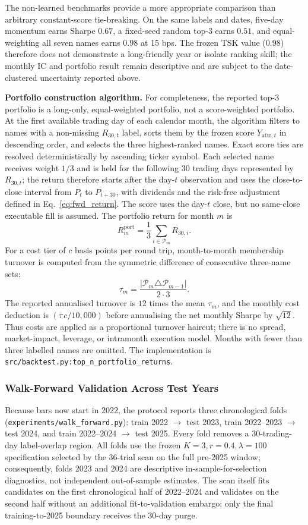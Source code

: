 \documentclass[pdflatex,sn-mathphys-num]{sn-jnl}
\theoremstyle{thmstyleone}
\theoremstyle{thmstyletwo}
\theoremstyle{thmstylethree}
\begin{document}
The non-learned benchmarks provide a more appropriate comparison than arbitrary constant-score tie-breaking. On the same labels and dates, five-day momentum earns Sharpe $0.67$, a fixed-seed random top-3 earns $0.51$, and equal-weighting all seven names earns $0.98$ at 15 bps. The frozen TSK value ($0.98$) therefore does not demonstrate a long-friendly year or isolate ranking skill; the monthly IC and portfolio result remain descriptive and are subject to the date-clustered uncertainty reported above.

\noindent\textbf{Portfolio construction algorithm.} For completeness, the reported top-3 portfolio is a long-only, equal-weighted portfolio, not a score-weighted portfolio. At the first available trading day of each calendar month, the algorithm filters to names with a non-missing $R_{30,t}$ label, sorts them by the frozen score $Y_{\mathrm{attr},t}$ in descending order, and selects the three highest-ranked names. Exact score ties are resolved deterministically by ascending ticker symbol. Each selected name receives weight $1/3$ and is held for the following 30 trading days represented by $R_{30,t}$; the return therefore starts after the day-$t$ observation and uses the close-to-close interval from $P_t$ to $P_{t+30}$, with dividends and the risk-free adjustment defined in Eq.~\eqref{eq:fwd_return}. The score uses the day-$t$ close, but no same-close executable fill is assumed. The portfolio return for month $m$ is
\[
R^{\mathrm{port}}_m = \frac{1}{3}\sum_{i\in\mathcal{P}_m}R_{30,i}.
\]
For a cost tier of $c$ basis points per round trip, month-to-month membership turnover is computed from the symmetric difference of consecutive three-name sets:
\[
\tau_m = \frac{|\mathcal{P}_m\triangle\mathcal{P}_{m-1}|}{2\cdot 3}.
\]
The reported annualised turnover is $12$ times the mean $\tau_m$, and the monthly cost deduction is $(\overline{\tau}\,c/10{,}000)$ before annualising the net monthly Sharpe by $\sqrt{12}$. Thus costs are applied as a proportional turnover haircut; there is no spread, market-impact, leverage, or intramonth execution model. Months with fewer than three labelled names are omitted. The implementation is \texttt{src/backtest.py:top\_n\_portfolio\_returns}.

\subsubsection{Walk-Forward Validation Across Test Years}\label{subsubsec4_3_wf}

Because bars now start in 2022, the protocol reports three chronological folds (\texttt{experiments/walk\_forward.py}): train 2022 $\rightarrow$ test 2023, train 2022--2023 $\rightarrow$ test 2024, and train 2022--2024 $\rightarrow$ test 2025. Every fold removes a 30-trading-day label-overlap region. All folds use the frozen $K=3,r=0.4,\lambda=100$ specification selected by the 36-trial scan on the full pre-2025 window; consequently, folds 2023 and 2024 are descriptive in-sample-for-selection diagnostics, not independent out-of-sample estimates. The scan itself fits candidates on the first chronological half of 2022--2024 and validates on the second half without an additional fit-to-validation embargo; only the final training-to-2025 boundary receives the 30-day purge.
\end{document}
